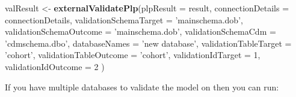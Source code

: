 \documentclass[11pt]{book}
\newenvironment{Shaded}{\begin{snugshade}}{\end{snugshade}}
\newcommand{\KeywordTok}[1]{\textcolor[rgb]{0.13,0.29,0.53}{\textbf{#1}}}
\newcommand{\DataTypeTok}[1]{\textcolor[rgb]{0.13,0.29,0.53}{#1}}
\newcommand{\DecValTok}[1]{\textcolor[rgb]{0.00,0.00,0.81}{#1}}
\newcommand{\StringTok}[1]{\textcolor[rgb]{0.31,0.60,0.02}{#1}}
\newcommand{\NormalTok}[1]{#1}
\begin{document}
\begin{Shaded}
\begin{Highlighting}[]
\NormalTok{valResult <-}\StringTok{ }\KeywordTok{externalValidatePlp}\NormalTok{(}\DataTypeTok{plpResult =}\NormalTok{ result, }
                    \DataTypeTok{connectionDetails =}\NormalTok{ connectionDetails,}
                    \DataTypeTok{validationSchemaTarget =} \StringTok{'mainschema.dob'}\NormalTok{,}
                    \DataTypeTok{validationSchemaOutcome =} \StringTok{'mainschema.dob'}\NormalTok{,}
                    \DataTypeTok{validationSchemaCdm =} \StringTok{'cdmschema.dbo'}\NormalTok{,}
                    \DataTypeTok{databaseNames =} \StringTok{'new database'}\NormalTok{,}
                    \DataTypeTok{validationTableTarget =} \StringTok{'cohort'}\NormalTok{,}
                    \DataTypeTok{validationTableOutcome =} \StringTok{'cohort'}\NormalTok{,}
                    \DataTypeTok{validationIdTarget =} \DecValTok{1}\NormalTok{,}
                    \DataTypeTok{validationIdOutcome =} \DecValTok{2}
\NormalTok{                    )}
\end{Highlighting}
\end{Shaded}

If you have multiple databases to validate the model on then you can
run:
\end{document}
